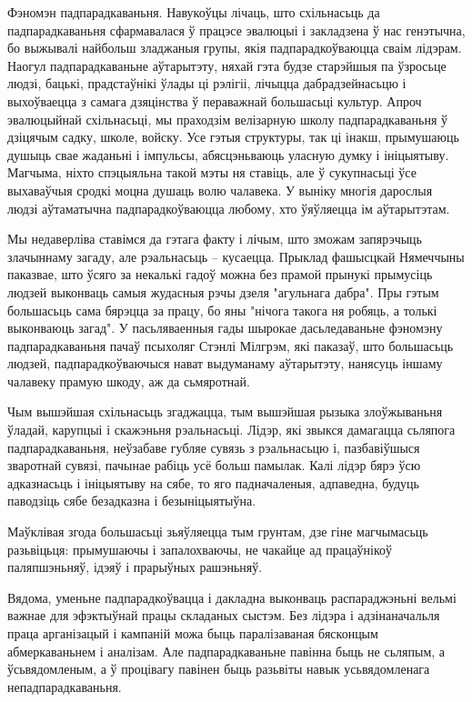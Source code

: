 Фэномэн падпарадкаваньня. Навукоўцы лічаць, што схільнасьць да падпарадкаваньня сфармавалася ў працэсе эвалюцыі і закладзена ў нас генэтычна, бо выжывалі найбольш зладжаныя групы, якія падпарадкоўваюцца сваім лідэрам. Наогул падпарадкаваньне аўтарытэту, няхай гэта будзе старэйшыя па ўзросьце людзі, бацькі, прадстаўнікі ўлады ці рэлігіі, лічыцца дабрадзейнасьцю і выхоўваецца з самага дзяцінства ў пераважнай большасьці культур. Апроч эвалюцыйнай схільнасьці, мы праходзім велізарную школу падпарадкаваньня ў дзіцячым садку, школе, войску. Усе гэтыя структуры, так ці інакш, прымушаюць душыць свае жаданьні і імпульсы, абясцэньваюць уласную думку і ініцыятыву. Магчыма, ніхто спэцыяльна такой мэты ня ставіць, але ў сукупнасьці ўсе выхаваўчыя сродкі моцна душаць волю чалавека. У выніку многія дарослыя людзі аўтаматычна падпарадкоўваюцца любому, хто ўяўляецца ім аўтарытэтам.

Мы недаверліва ставімся да гэтага факту і лічым, што зможам запярэчыць злачыннаму загаду, але рэальнасьць – кусаецца. Прыклад фашысцкай Нямеччыны паказвае, што ўсяго за некалькі гадоў можна без прамой прынукі прымусіць людзей выконваць самыя жудасныя рэчы дзеля "агульнага дабра". Пры гэтым большасьць сама бярэцца за працу, бо яны "нічога такога ня робяць, а толькі выконваюць загад". У пасьляваенныя гады шырокае дасьледаваньне фэномэну падпарадкаваньня пачаў псыхоляг Стэнлі Мілгрэм, які паказаў, што большасьць людзей, падпарадкоўваючыся нават выдуманаму аўтарытэту, нанясуць іншаму чалавеку прамую шкоду, аж да сьмяротнай.

Чым вышэйшая схільнасьць згаджацца, тым вышэйшая рызыка злоўжываньня ўладай, карупцыі і скажэньня рэальнасьці. Лідэр, які звыкся дамагацца сьляпога падпарадкаваньня, неўзабаве губляе сувязь з рэальнасьцю і, пазбавіўшыся зваротнай сувязі, пачынае рабіць усё больш памылак. Калі лідэр бярэ ўсю адказнасьць і ініцыятыву на сябе, то яго падначаленыя, адпаведна, будуць паводзіць сябе безадказна і безыніцыятыўна. 

Маўклівая згода большасьці зьяўляецца тым грунтам, дзе гіне магчымасьць разьвіцьця: прымушаючы і запалохваючы, не чакайце ад працаўнікоў паляпшэньняў, ідэяў і прарыўных рашэньняў.

Вядома, уменьне падпарадкоўвацца і дакладна выконваць распараджэньні вельмі важнае для эфэктыўнай працы складаных сыстэм. Без лідэра і адзінаначальля праца арганізацый і кампаній можа быць паралізаваная бясконцым абмеркаваньнем і аналізам. Але падпарадкаваньне павінна быць не сьляпым, а ўсьвядомленым, а ў процівагу павінен быць разьвіты навык усьвядомленага непадпарадкаваньня. 

